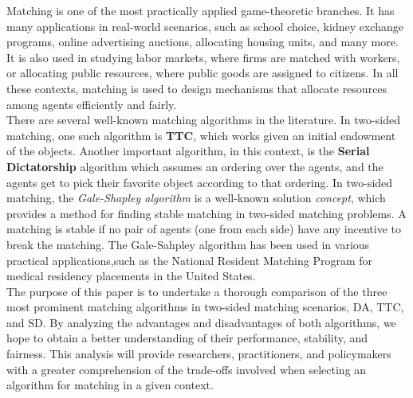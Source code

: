 \documentclass[a4paper,11pt,table]{article}
\theoremstyle{definition}
\theoremstyle{remark}
\begin{document}
Matching is one of the most practically applied game-theoretic branches. It has many applications in real-world scenarios, such as school choice, kidney exchange programs, online advertising auctions, allocating housing units, and many more. It is also used in studying labor markets, where firms are matched with workers, or allocating public resources, where public goods are assigned to citizens. In all these contexts, matching is used to design mechanisms that allocate resources among agents efficiently and fairly.
\\

There are several well-known matching algorithms in the literature. In two-sided matching, one such algorithm is \textbf{TTC}, which works given an initial endowment of the objects. Another important algorithm, in this
context, is the \textbf{Serial Dictatorship} algorithm which assumes an ordering over the agents, and the agents get to pick their favorite object according to that ordering. In two-sided matching, the \textit{Gale-Shapley algorithm} is a well-known solution \textit{concept}, which provides a method for finding stable matching in two-sided matching
problems. A matching is stable if no pair of agents (one from each side) have any incentive to break the matching. The Gale-Sahpley algorithm has been used in various practical applications,such as the National Resident Matching Program for medical residency placements in the United States.
\\

The purpose of this paper is to undertake a thorough comparison of the three most prominent matching algorithms in two-sided matching scenarios, DA, TTC, and SD. By analyzing the advantages and disadvantages of both algorithms, we hope to obtain a better understanding of their performance, stability, and fairness. This analysis will provide researchers, practitioners, and policymakers with a greater comprehension of the trade-offs involved when selecting an algorithm for matching in a given context.


\end{document}
